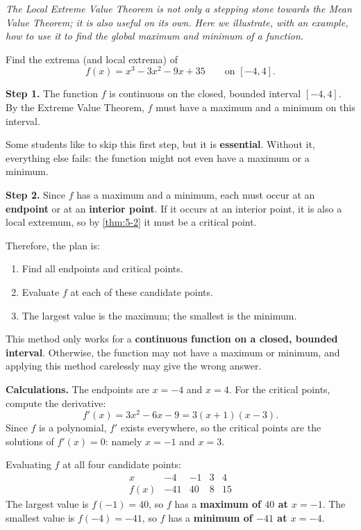 \textit{The Local Extreme Value Theorem is not only a stepping stone towards the Mean Value Theorem; it is also useful on its own.  Here we illustrate, with an example, how to use it to find the global maximum and minimum of a function.}

\begin{example}
\label{ex:5-1}
Find the extrema (and local extrema) of
\[
  f(x) = x^{3} - 3x^{2} - 9x + 35 \qquad \text{on } [-4, 4].
\]

\textbf{Step 1.}  The function $f$ is continuous on the closed, bounded interval $[-4, 4]$.  By the Extreme Value Theorem, $f$ must have a maximum and a minimum on this interval.

\begin{remark}[Warning]
Some students like to skip this first step, but it is \textbf{essential}.  Without it, everything else fails: the function might not even have a maximum or a minimum.
\end{remark}

\textbf{Step 2.}  Since $f$ has a maximum and a minimum, each must occur at an \textbf{endpoint} or at an \textbf{interior point}.  If it occurs at an interior point, it is also a local extremum, so by \cref{thm:5-2} it must be a critical point.

Therefore, the plan is:
\begin{enumerate}[label=(\roman*)]
  \item Find all endpoints and critical points.
  \item Evaluate $f$ at each of these candidate points.
  \item The largest value is the maximum; the smallest is the minimum.
\end{enumerate}

\begin{remark}[Warning]
This method only works for a \textbf{continuous function on a closed, bounded interval}.  Otherwise, the function may not have a maximum or minimum, and applying this method carelessly may give the wrong answer.
\end{remark}

\textbf{Calculations.}  The endpoints are $x = -4$ and $x = 4$.  For the critical points, compute the derivative:
\[
  f'(x) = 3x^{2} - 6x - 9 = 3(x + 1)(x - 3).
\]
Since $f$ is a polynomial, $f'$ exists everywhere, so the critical points are the solutions of $f'(x) = 0$: namely $x = -1$ and $x = 3$.

Evaluating $f$ at all four candidate points:
\[
\begin{array}{c|cccc}
  x   & -4  & -1 & 3   & 4  \\ \hline
  f(x) & -41 & 40 & 8  & 15
\end{array}
\]
The largest value is $f(-1) = 40$, so $f$ has a \textbf{maximum of $40$ at $x = -1$}.  The smallest value is $f(-4) = -41$, so $f$ has a \textbf{minimum of $-41$ at $x = -4$}.


\end{example}
